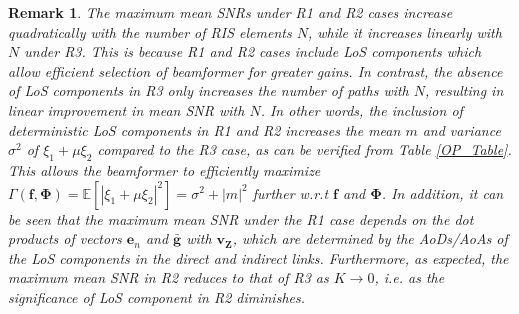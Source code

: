 \documentclass[journal,draftclsnofoot,onecolumn,12pt]{IEEEtran}
\newtheorem{remark}{Remark}
\newtheorem{corollary}{Corollary}[theorem]
\begin{document}
\begin{remark}
The maximum mean SNRs under R1 and R2 cases increase quadratically with the number of RIS elements $N$, while  it increases linearly with $N$ under R3. This is because R1 and R2 cases include LoS components which allow efficient selection of beamformer for greater gains. In contrast, the absence of LoS components in R3 only increases the number of paths with $N$, resulting in linear improvement in mean SNR with $N$. In other words, the inclusion of deterministic LoS components in R1 and R2 increases the mean $m$ and variance $\sigma^2$  of $\xi_1 + \mu \xi_2$ compared to the R3 case, as can be verified from Table \ref{OP_Table}. This allows the beamformer to efficiently maximize $\Gamma(\mathbf{f},\mathbf{\Phi})=\mathbb{E}[|\xi_1+\mu\xi_2|^2]=\sigma^2+|m|^2$ further w.r.t $\mathbf{f}$ and $\mathbf{\Phi}$. \newline
In addition, it can be seen that the maximum mean SNR under the R1 case depends on the dot products of vectors $\mathbf{e}_n$ and $\mathbf{\bar{g}}$ with $\mathbf{v_Z}$, which are determined by the AoDs/AoAs of the LoS components in the direct and indirect links. 
Furthermore, as expected, the maximum mean SNR in R2 reduces to that of R3 as $K\to 0$, i.e. as the significance of LoS component in R2 diminishes.
       
\end{remark}
\end{document}

